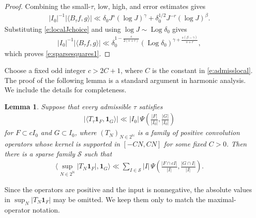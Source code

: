 \documentclass[12pt,reqno]{amsart}
\numberwithin{equation}{section}
\newtheorem{lemma}[equation]{Lemma}
\theoremstyle{definition}
\theoremstyle{remark}
\newcommand{\Log}{\operatorname{Log}}
\begin{document}
\begin{proof}
Combining the small-$\tau$, low, high, and error estimates gives
\begin{align*}
 |I_0|^{-1}|\langle B_\tau f,g\rangle|
 \ll
 \delta_0J^s(\log J)^\gamma
 +\delta_0^{1/2}J^{-r}(\log J)^\beta .
\end{align*}
Substituting \eqref{e:localJchoice} and using
$\log J\sim \Log\delta_0$ gives
\begin{align*}
 |I_0|^{-1}|\langle B_\tau f,g\rangle|
 \ll \delta_0^{1-\frac{s}{2(s+r)}}
 (\Log\delta_0)^{
 \gamma+\frac{s(\beta-\gamma)}{s+r}},
\end{align*}
which proves \eqref{e:sparsesquares1}.
\end{proof}

Choose a fixed odd integer \(c>2C+1\), where \(C\) is the constant in
\eqref{e:admisslocal}.  The proof of the following lemma is a standard argument in harmonic analysis. We include the details for completeness.



\begin{lemma}\label{l:sparserecursion}
Suppose that every admissible $\tau$ satisfies
\begin{align}\label{e:localform}
 |\langle T_\tau\mathbf1_F,\mathbf1_G\rangle|
 \ll |I_0|\,\Psi\left(\frac{|F|}{|I_0|},
                       \frac{|G|}{|I_0|}\right)
\end{align}
for $F\subset cI_0$ and $G\subset I_0$, where $(T_N)_{N\in2^{\mathbb N}}$ is a family of positive convolution operators whose kernel is supported in
$[-CN,CN]$ for some fixed $C>0$.  Then there is a sparse family $\mathcal S$ such that
\begin{align}\label{e:recursionconclusion}
 \langle\sup_{N\in2^{\mathbb N}}|T_N\mathbf1_F|,\mathbf1_G\rangle
 \ll\sum_{I\in\mathcal S}|I|\,
 \Psi\left(\frac{|F\cap cI|}{|I|},
            \frac{|G\cap I|}{|I|}\right).
\end{align}
\end{lemma}

Since the operators are positive and the input is nonnegative, the absolute
values in \(\sup_N|T_N\mathbf1_F|\) may be omitted.  We keep them only to
match the maximal-operator notation.
\end{document}
